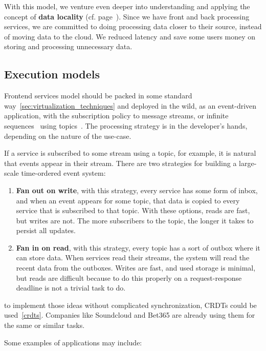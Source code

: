 With this model, we venture even deeper into understanding and applying the concept of \textbf{data locality} (cf. page~\pageref{ds:data_locality}). Since we have front and back processing services, we are committed to doing processing data closer to their source, instead of moving data to the cloud. We reduced latency and save some users money on storing and processing unnecessary data.
%
%
\subsection{Execution models}\label{sec:execution_models}
%
Frontend services model should be packed in some standard way~\ref{sec:virtualization_techniques} and deployed in the wild, as an event-driven application, with the subscription policy to message streams, or infinite sequences~\cite{Rutten03} using topics~\cite{inproceedingsBeck}. The processing strategy is in the developer's hands, depending on the nature of the use-case. 

If a service is subscribed to some stream using a topic, for example, it is natural that events appear in their stream. There are two strategies for building a large-scale time-ordered event system:

\begin{enumerate}[start=1,label={(\bfseries \arabic*)}]
	\item \textbf{Fan out on write}, with this strategy, every service has some form of inbox, and when an event appears for some topic, that data is copied to every service that is subscribed to that topic. With these options, reads are fast, but writes are not. The more subscribers to the topic, the longer it takes to persist all updates. 
	\item \textbf{Fan in on read}, with this strategy, every topic has a sort of outbox where it can store data. When services read their streams, the system will read the recent data from the outboxes. Writes are fast, and used storage is minimal, but reads are difficult because to do this properly on a request-response deadline is not a trivial task to do.
\end{enumerate}

\noindent 
to implement those ideas without complicated synchronization, CRDTs could be used~\ref{crdts}. Companies like Soundcloud and Bet365 are already using them for the same or similar tasks.

Some examples of applications may include:

